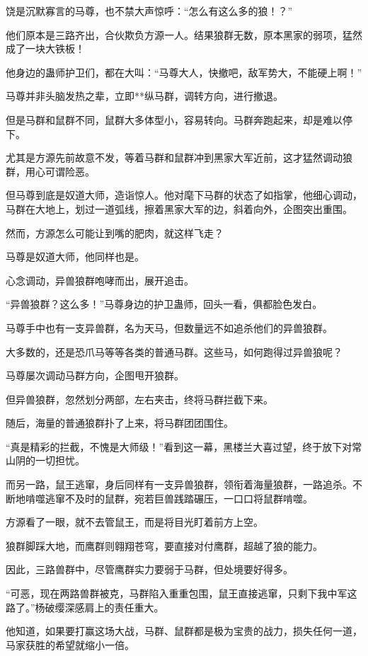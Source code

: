 \begin{this_body}
饶是沉默寡言的马尊，也不禁大声惊呼：“怎么有这么多的狼！？”

他们原本是三路齐出，合伙欺负方源一人。结果狼群无数，原本黑家的弱项，猛然成了一块大铁板！

他身边的蛊师护卫们，都在大叫：“马尊大人，快撤吧，敌军势大，不能硬上啊！”

马尊并非头脑发热之辈，立即**纵马群，调转方向，进行撤退。

但是马群和鼠群不同，鼠群大多体型小，容易转向。马群奔跑起来，却是难以停下。

尤其是方源先前故意不发，等着马群和鼠群冲到黑家大军近前，这才猛然调动狼群，用心可谓险恶。

但马尊到底是奴道大师，造诣惊人。他对麾下马群的状态了如指掌，他细心调动，马群在大地上，划过一道弧线，擦着黑家大军的边，斜着向外，企图突出重围。

然而，方源怎么可能让到嘴的肥肉，就这样飞走？

马尊是奴道大师，他同样也是。

心念调动，异兽狼群咆哮而出，展开追击。

“异兽狼群？这么多！”马尊身边的护卫蛊师，回头一看，俱都脸色发白。

马尊手中也有一支异兽群，名为天马，但数量远不如追杀他们的异兽狼群。

大多数的，还是恐爪马等等各类的普通马群。这些马，如何跑得过异兽狼呢？

马尊屡次调动马群方向，企图甩开狼群。

但异兽狼群，忽然划分两部，左右夹击，终将马群拦截下来。

随后，海量的普通狼群扑了上来，将马群团团围住。

“真是精彩的拦截，不愧是大师级！”看到这一幕，黑楼兰大喜过望，终于放下对常山阴的一切担忧。

而另一路，鼠王逃窜，身后同样有一支异兽狼群，领衔着海量狼群，一路追杀。不断地啃噬逃窜不及时的鼠群，宛若巨兽践踏碾压，一口口将鼠群啃噬。

方源看了一眼，就不去管鼠王，而是将目光盯着前方上空。

狼群脚踩大地，而鹰群则翱翔苍穹，要直接对付鹰群，超越了狼的能力。

因此，三路兽群中，尽管鹰群实力要弱于马群，但处境要好得多。

“可恶，现在两路兽群被克，马群陷入重重包围，鼠王直接逃窜，只剩下我中军这路了。”杨破缨深感肩上的责任重大。

他知道，如果要打赢这场大战，马群、鼠群都是极为宝贵的战力，损失任何一道，马家获胜的希望就缩小一倍。


\end{this_body}
